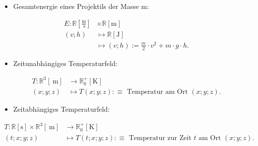 \documentclass[10pt]{article}
\begin{document}
\begin{itemize}
  \item Gesamtenergie eines Projektils der Masse m:
\end{itemize}


\begin{align*}
E: \mathbb{R}\left[\frac{\mathrm{m}}{\mathrm{~s}}\right] & \times \mathbb{R}[\mathrm{m}] \\
(v ; h) & \mapsto \mathbb{R}[\mathrm{J}]  \tag{2.14}\\
& \mapsto(v ; h):=\frac{m}{2} \cdot v^{2}+m \cdot g \cdot h .
\end{align*}


\begin{itemize}
  \item Zeitunabhängiges Temperaturfeld:
\end{itemize}


\begin{align*}
T: \mathbb{R}^{3}[\mathrm{~m}] & \rightarrow \mathbb{R}_{0}^{+}[\mathrm{K}] \\
(x ; y ; z) & \mapsto T(x ; y ; z): \equiv \text { Temperatur am Ort }(x ; y ; z) . \tag{2.15}
\end{align*}


\begin{itemize}
  \item Zeitabhängiges Temperaturfeld:
\end{itemize}


\begin{align*}
T: \mathbb{R}[\mathrm{s}] \times \mathbb{R}^{3}[\mathrm{~m}] & \rightarrow \mathbb{R}_{0}^{+}[\mathrm{K}] \\
(t ; x ; y ; z) & \mapsto T(t ; x ; y ; z): \equiv \text { Temperatur zur Zeit } t \text { am Ort }(x ; y ; z) . \tag{2.16}
\end{align*}
\end{document}
